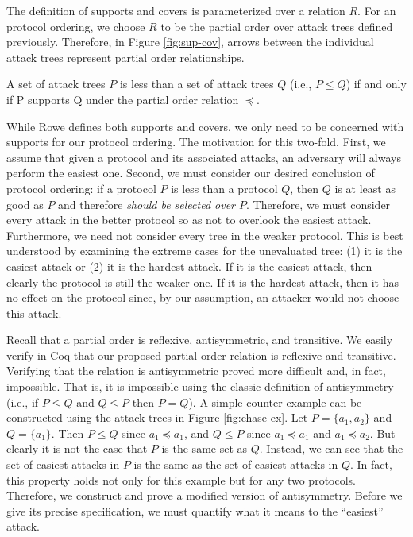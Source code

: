 \documentclass[runningheads]{llncs}
\theoremstyle{definition}
\begin{document}
The definition of supports and covers is parameterized over a relation $R$. For an protocol ordering, we choose $R$ to be the partial order over attack trees defined previously. Therefore, in Figure \ref{fig:sup-cov}, arrows between the individual attack trees represent partial order relationships.

\begin{definition}
  A set of attack trees $P$ is less than a set of attack trees $Q$ (i.e., $P \leq Q$) if and only if P supports Q under the partial order relation $\preceq$.
\end{definition} 

While Rowe defines both supports and covers, we only need to be concerned with supports for our protocol ordering. The motivation for this two-fold. First, we assume that given a protocol and its associated attacks, an adversary will always perform the easiest one.
Second, we must consider our desired conclusion of protocol ordering: if a protocol $P$ is less than a protocol $Q$, then $Q$ is at least as good as $P$ and therefore \emph{should be selected over $P$}. Therefore, we must consider every attack in the better protocol so as not to overlook the easiest attack. Furthermore, we need not consider every tree in the weaker protocol. This is best understood by examining the extreme cases for the unevaluated tree: (1) it is the easiest attack or (2) it is the hardest attack. If it is the easiest attack, then clearly the protocol is still the weaker one. If it is the hardest attack, then it has no effect on the protocol since, by our assumption, an attacker would not choose this attack.

Recall that a partial order is reflexive, antisymmetric, and transitive. We easily verify in Coq that our proposed partial order relation is reflexive and transitive. Verifying that the relation is antisymmetric proved more difficult and, in fact, impossible. That is, it is impossible using the classic definition of antisymmetry (i.e., if $P \le Q$ and $Q \le P$ then $P = Q$). A simple counter example can be constructed using the attack trees in Figure \ref{fig:chase-ex}. Let $P = \{a_1,a_2\}$ and $Q = \{a_1\}$. Then $P \le Q$ since $a_1 \preceq a_1$, and $Q \le P$ since $a_1 \preceq a_1$ and $a_1 \preceq a_2$. But clearly it is not the case that $P$ is the same set as $Q$. Instead, we can see that the set of easiest attacks in $P$ is the same as the set of easiest attacks in $Q$. In fact, this property holds not only for this example but for any two protocols. Therefore, we construct and prove a modified version of antisymmetry. Before we give its precise specification, we must quantify what it means to the ``easiest'' attack.
\end{document}
